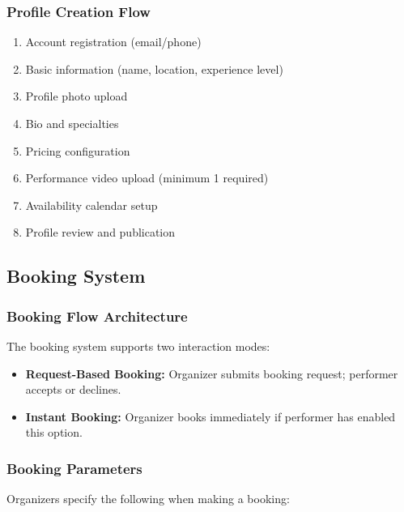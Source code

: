 \documentclass[11pt,a4paper]{article}
\begin{document}
\subsubsection{Profile Creation Flow}
\begin{enumerate}[leftmargin=1.5em]
  \item Account registration (email/phone)
  \item Basic information (name, location, experience level)
  \item Profile photo upload
  \item Bio and specialties
  \item Pricing configuration
  \item Performance video upload (minimum 1 required)
  \item Availability calendar setup
  \item Profile review and publication
\end{enumerate}

\subsection{Booking System}

\subsubsection{Booking Flow Architecture}
The booking system supports two interaction modes:

\begin{itemize}[leftmargin=1.5em]
  \item \textbf{Request-Based Booking:} Organizer submits booking request;
        performer accepts or declines.
  \item \textbf{Instant Booking:} Organizer books immediately if performer has
        enabled this option.
\end{itemize}

\subsubsection{Booking Parameters}
Organizers specify the following when making a booking:
\end{document}
